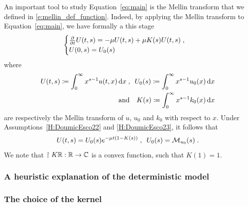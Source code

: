     An important tool to study Equation~\eqref{eq:main} is the Mellin transform that we defined in \eqref{e:mellin_def_function}. Indeed, by applying the Mellin transform to Equation~\eqref{eq:main}, we have formally a this stage
	\begin{equation*}
        \begin{cases}
		\frac{\partial}{\partial t} U(t,s) = - \mu U(t,s) + \mu K(s) U(t,s)
		\; , \\
        U(0,s) = U_0(s)
    \end{cases}
	\end{equation*}
    where
    \begin{equation*}
        \begin{split}
        U(t,s) \coloneqq \int_0^\infty x^{s-1} u(t,x) \,\mathrm{d} x 
        \; , \enspace U_0(s) \coloneqq \int_0^\infty x^{s-1} u_0(x) \,\mathrm{d} x \\
        \quad \text{and} \quad K(s) \coloneqq \int_0^\infty x^{s-1} k_0(x) \,\mathrm{d} x 
        \end{split}
    \end{equation*}
    are respectively the Mellin transform of $u$, $u_0$ and $k_0$ with respect to $x$.    
    Under Assumptions~\eqref{H:DoumicEsco22} and \eqref{H:DoumicEsco23}, it follows that
    \begin{equation*}
        U(t,s) = U_0(s) e^{-\mu t(1 - K(s) ) }
        \; , \enspace
        U_0(s) = \mathcal{M}_{u_0}(s)
        \; .
    \end{equation*}
    We note that $\restriction{K}{\mathbb{R}} : \mathbb{R} \to \mathbb{C}$ is a convex function, such that $K(1) = 1$.



   \subsubsection{A heuristic explanation of the deterministic model}


    \subsubsection{The choice of the kernel}

